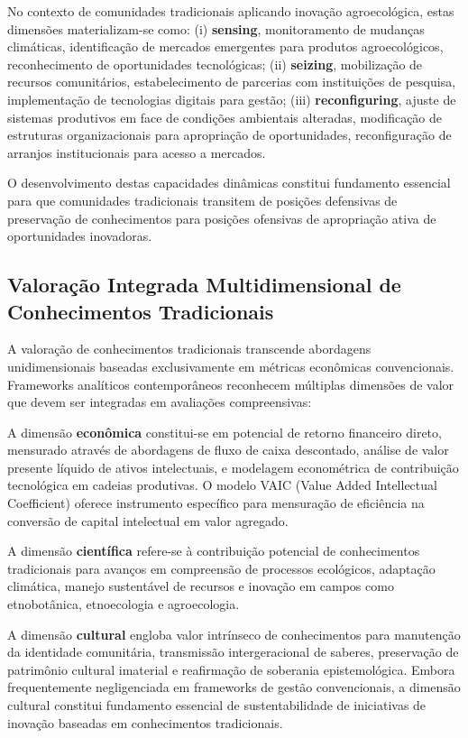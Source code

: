 No contexto de comunidades tradicionais aplicando inovação agroecológica, estas dimensões materializam-se como: (i) \textbf{sensing}, monitoramento de mudanças climáticas, identificação de mercados emergentes para produtos agroecológicos, reconhecimento de oportunidades tecnológicas; (ii) \textbf{seizing}, mobilização de recursos comunitários, estabelecimento de parcerias com instituições de pesquisa, implementação de tecnologias digitais para gestão; (iii) \textbf{reconfiguring}, ajuste de sistemas produtivos em face de condições ambientais alteradas, modificação de estruturas organizacionais para apropriação de oportunidades, reconfiguração de arranjos institucionais para acesso a mercados.

O desenvolvimento destas capacidades dinâmicas constitui fundamento essencial para que comunidades tradicionais transitem de posições defensivas de preservação de conhecimentos para posições ofensivas de apropriação ativa de oportunidades inovadoras.

\subsection{Valoração Integrada Multidimensional de Conhecimentos Tradicionais}

A valoração de conhecimentos tradicionais transcende abordagens unidimensionais baseadas exclusivamente em métricas econômicas convencionais. Frameworks analíticos contemporâneos reconhecem múltiplas dimensões de valor que devem ser integradas em avaliações compreensivas:

A dimensão \textbf{econômica} constitui-se em potencial de retorno financeiro direto, mensurado através de abordagens de fluxo de caixa descontado, análise de valor presente líquido de ativos intelectuais, e modelagem econométrica de contribuição tecnológica em cadeias produtivas. O modelo VAIC (Value Added Intellectual Coefficient) \cite{Pulic2000} oferece instrumento específico para mensuração de eficiência na conversão de capital intelectual em valor agregado.

A dimensão \textbf{científica} refere-se à contribuição potencial de conhecimentos tradicionais para avanços em compreensão de processos ecológicos, adaptação climática, manejo sustentável de recursos e inovação em campos como etnobotânica, etnoecologia e agroecologia.

A dimensão \textbf{cultural} engloba valor intrínseco de conhecimentos para manutenção da identidade comunitária, transmissão intergeracional de saberes, preservação de patrimônio cultural imaterial e reafirmação de soberania epistemológica. Embora frequentemente negligenciada em frameworks de gestão convencionais, a dimensão cultural constitui fundamento essencial de sustentabilidade de iniciativas de inovação baseadas em conhecimentos tradicionais.

